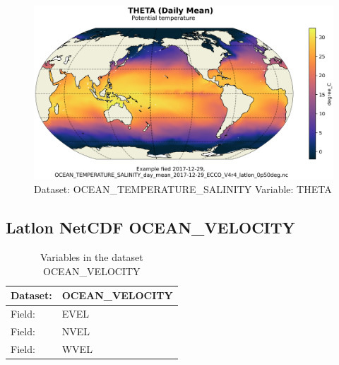 \begin{figure}[H]
\centering
\includegraphics[scale=0.55]{../images/plots/latlon_plots/Ocean_Temperature_and_Salinity/THETA.png}
\caption{Dataset: OCEAN\_TEMPERATURE\_SALINITY Variable: THETA}
\label{tab:table-OCEAN_TEMPERATURE_SALINITY_THETA-Plot}
\end{figure}
\pagebreak
\subsection{Latlon NetCDF OCEAN\_VELOCITY}
\newp
\begin{longtable}{|p{}|p{}|}
\caption{Variables in the dataset OCEAN\_VELOCITY}
\label{tab:table-OCEAN_VELOCITY-fields} \\ 
\hline \endhead \hline \endfoot
\rowcolor{lightgray} \textbf{Dataset:} & \textbf{OCEAN\_VELOCITY} \\ \hline
Field: &EVEL \\ \hline
Field: &NVEL \\ \hline
Field: &WVEL \\ \hline
\end{longtable}

\pagebreak
